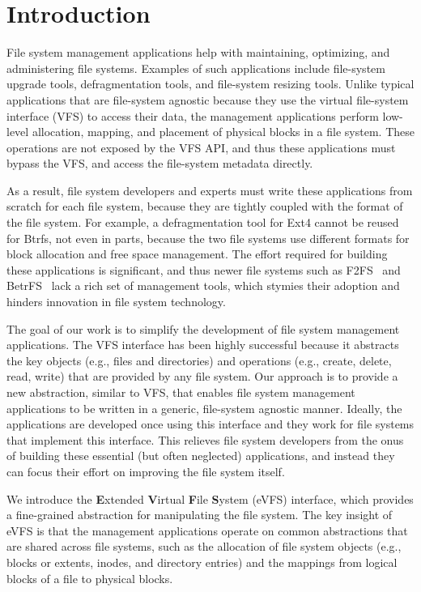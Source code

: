 \section{Introduction\label{sec:Introduction}}
File system management applications help with maintaining, optimizing, and administering file systems. Examples of such applications include file-system upgrade tools, defragmentation tools, and file-system resizing tools. Unlike typical applications that are file-system agnostic because they use the virtual file-system interface (VFS) to access their data, the management applications perform low-level allocation, mapping, and placement of physical blocks in a file system. These operations are not exposed by the VFS API, and thus these applications must bypass the VFS, and access the file-system metadata directly.

As a result, file system developers and experts must write these applications from scratch for each file system, because they are tightly coupled with the format of the file system. For example, a defragmentation tool for Ext4 cannot be reused for Btrfs, not even in parts, because the two file systems use different formats for block allocation and free space management. The effort required for building these applications is significant, and thus newer file systems such as F2FS~\cite{lee2015f2fs} and BetrFS~\cite{betrfs-2015-tos} lack a rich set of management tools, which stymies their adoption and hinders innovation in file system technology.

The goal of our work is to simplify the development of file system management applications. The VFS interface has been highly successful because it abstracts the key objects (e.g., files and directories) and operations (e.g., create, delete, read, write) that are provided by any file system. Our approach is to provide a new abstraction, similar to VFS, that enables file system management applications to be written in a generic, file-system agnostic manner. Ideally, the applications are developed once using this interface and they work for file systems that implement this interface.  This relieves file system developers from the onus of building these essential (but often neglected) applications, and instead they can focus their effort on improving the file system itself.

We introduce the \textbf{E}xtended \textbf{V}irtual \textbf{F}ile \textbf{S}ystem (eVFS) interface, which provides a fine-grained abstraction for manipulating the file system. The key insight of eVFS is that the management applications operate on common abstractions that are shared across file systems, such as the allocation of file system objects (e.g., blocks or extents, inodes, and directory entries) and the mappings from logical blocks of a file to physical blocks.

